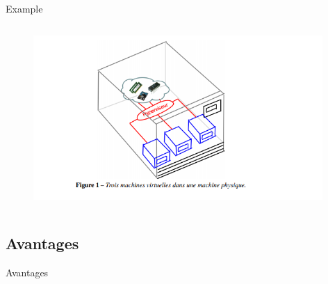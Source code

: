 \documentclass[12pt, c]{beamer}
\begin{document}
		\begin{frame}{Example}
			\transfade
			\vspace{-0.3cm}
			\begin{figure}
				\begin{center}
					\includegraphics[width=11cm,height=7cm]{images/ex_virtual.PNG}
				\end{center}
			\end{figure}
		\end{frame}
	
	
	\subsection{Avantages}
			\begin{frame}{Avantages}
				\transwipe
				\vspace{-0.25cm}
				\begin{block}
					
				\end{block}
			\end{frame}
			

		
		
\end{document}
